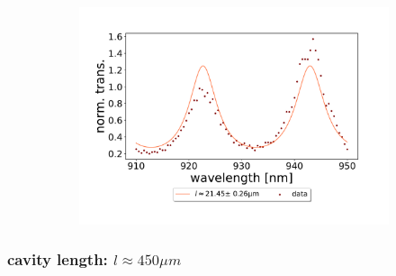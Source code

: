 \begin{figure}[h!] \ContinuedFloat
    \centering
    \begin{subfigure}[b]{0.49\textwidth}
        \includegraphics[width=\textwidth]{figures/results/double fano fits/20250326/21um_M3:M5_FSR_scan.pdf}
        \caption{}
        \label{fig:21um_M3:M5_FSR_scan}
    \end{subfigure}
\end{figure}

\clearpage
\subsubsection*{cavity length: $l \approx 450 \mu m$}


